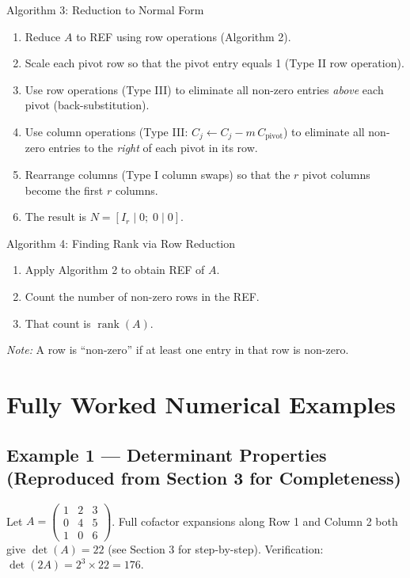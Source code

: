 \documentclass[12pt,a4paper]{article}
\begin{document}
\begin{infobox}{Algorithm 3: Reduction to Normal Form}
\begin{enumerate}[label=\arabic*.]
  \item Reduce $A$ to REF using row operations (Algorithm 2).
  \item Scale each pivot row so that the pivot entry equals 1 (Type II row operation).
  \item Use row operations (Type III) to eliminate all non-zero entries \emph{above} each pivot (back-substitution).
  \item Use column operations (Type III: $C_j \leftarrow C_j - m\,C_{\text{pivot}}$) to eliminate all non-zero entries to the \emph{right} of each pivot in its row.
  \item Rearrange columns (Type I column swaps) so that the $r$ pivot columns become the first $r$ columns.
  \item The result is $N = [I_r \mid 0;\; 0 \mid 0]$.
\end{enumerate}
\end{infobox}

\begin{infobox}{Algorithm 4: Finding Rank via Row Reduction}
\begin{enumerate}[label=\arabic*.]
  \item Apply Algorithm 2 to obtain REF of $A$.
  \item Count the number of non-zero rows in the REF.
  \item That count is $\operatorname{rank}(A)$.
\end{enumerate}
\emph{Note:} A row is ``non-zero'' if at least one entry in that row is non-zero.
\end{infobox}

\section{Fully Worked Numerical Examples}

\subsection*{Example 1 --- Determinant Properties (Reproduced from Section 3 for Completeness)}

Let $A = \begin{pmatrix}1&2&3\\0&4&5\\1&0&6\end{pmatrix}$.
Full cofactor expansions along Row 1 and Column 2 both give $\det(A) = 22$ (see Section 3 for step-by-step).
Verification: $\det(2A) = 2^3\times22 = 176$.
\end{document}
